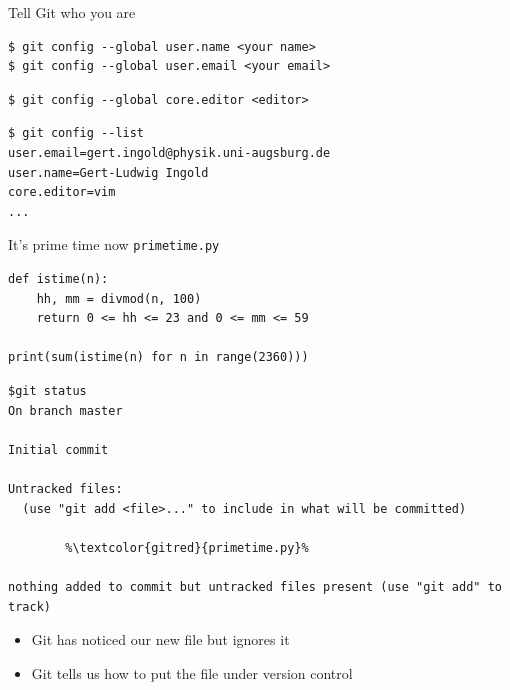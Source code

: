 \documentclass[svgnames]{beamer}
\begin{document}
\begin{frame}[fragile]{Tell Git who you are}

 \begin{lstlisting}
$ git config --global user.name <your name>
$ git config --global user.email <your email>
 \end{lstlisting}

 \vspace{\baselineskip}
 \begin{lstlisting}
$ git config --global core.editor <editor>
 \end{lstlisting}

 \vspace{\baselineskip}
 \begin{lstlisting}
$ git config --list
user.email=gert.ingold@physik.uni-augsburg.de
user.name=Gert-Ludwig Ingold
core.editor=vim
...
 \end{lstlisting}
\end{frame}

\begin{frame}[fragile]{It's prime time now}
 \texttt{primetime.py}
 \begin{lstlisting}
def istime(n):
    hh, mm = divmod(n, 100)
    return 0 <= hh <= 23 and 0 <= mm <= 59

print(sum(istime(n) for n in range(2360)))
 \end{lstlisting}

 \vspace{0.2truecm}
 \begin{lstlisting}[breaklines=true
                    ,escapechar=\%]
$git status
On branch master

Initial commit

Untracked files:
  (use "git add <file>..." to include in what will be committed)

        %\textcolor{gitred}{primetime.py}%

nothing added to commit but untracked files present (use "git add" to track)
 \end{lstlisting}
 \begin{itemize}
  \item Git has noticed our new file but ignores it
  \item Git tells us how to put the file under version control
 \end{itemize}
\end{frame}
\end{document}
